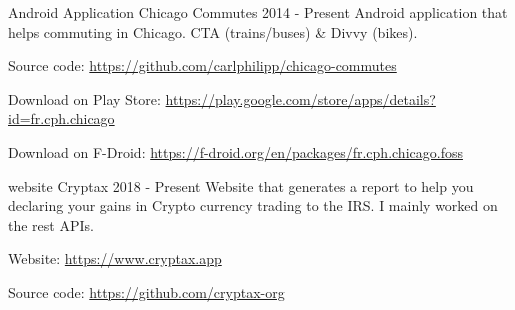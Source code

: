 

\begin{cventries}

  \projectentry
    {Android Application} %
    {Chicago Commutes} %
    {2014 - Present} %
    {Android application that helps commuting in Chicago. CTA (trains/buses) \& Divvy (bikes).\linebreak
{}
    }
    {
    \begin{projectdetails}
        	\item Source code: \href{https://github.com/carlphilipp/chicago-commutes}{https://github.com/carlphilipp/chicago-commutes}
			\item Download on Play Store: \href{https://play.google.com/store/apps/details?id=fr.cph.chicago}{https://play.google.com/store/apps/details?id=fr.cph.chicago}
			\item Download on F-Droid: \href{https://f-droid.org/en/packages/fr.cph.chicago.foss}{https://f-droid.org/en/packages/fr.cph.chicago.foss}
     \end{projectdetails}
   }

  \vspace{-2.0mm}
  \projectentry
    {website} %
    {Cryptax} %
    {2018 - Present} %
    {Website that generates a report to help you declaring your gains in Crypto currency trading to the IRS. I mainly worked on the rest APIs.\linebreak
    }
    {
    \begin{projectdetails}
        	\item Website: \href{https://www.cryptax.app}{https://www.cryptax.app}
			\item Source code: \href{https://github.com/cryptax-org}{https://github.com/cryptax-org}
     \end{projectdetails}
    }


\end{cventries}

